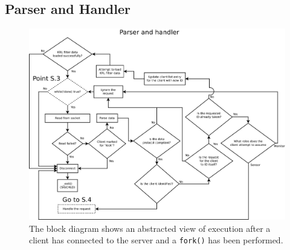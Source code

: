 \documentclass[12pt,english,a4paper]{report}
\begin{document}
\subsection{Parser and Handler}\label{parser_and_handler}
\begin{figure}
\centering
  \includegraphics[angle=90,scale=0.3]{server_flow.pdf}
   \caption[Socket Server execution flow block diagram]{The block diagram shows an abstracted view of execution after a client has connected to the server and a \texttt{fork()} has been performed.}
   \label{server_flow}
\end{figure}
\end{document}
